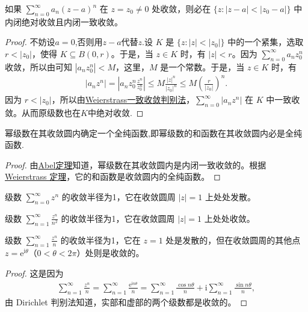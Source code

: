 \documentclass[../../main.tex]{subfiles}%
\begin{document}
\begin{theorem}[Abel定理]\label{theorem:Abel定理-定理4.2.3}
如果 \( \sum_{n=0}^{\infty} a_n (z-a)^n \) 在 \( z = z_0 \neq 0 \) 处收敛，则必在 \( \{z : |z-a| < |z_0-a|\} \) 中内闭绝对收敛且内闭一致收敛。
\end{theorem}
\begin{proof}

不妨设$a=0$,否则用$z-a$代替$z$.设 \( K \) 是 \( \{z : |z| < |z_0|\} \) 中的一个紧集，选取 \( r < |z_0| \)，使得 \( K \subseteq B(0, r) \)。于是，当 \( z \in K \) 时，有 \( |z| < r \)。因为 \( \sum_{n=0}^{\infty} a_n z_0^n \) 收敛，所以由可知 \( |a_n z_0^n| < M \)，这里，\( M \) 是一个常数。于是，当 \( z \in K \) 时，有
\begin{align*}
|a_n z^n| = \left| a_n z_0^n \frac{z^n}{z_0^n} \right| \leqslant M \frac{|z|^n}{|z_0|^n} \leqslant M \left( \frac{r}{|z_0|} \right)^n.
\end{align*}
因为 \( r < |z_0| \)，所以由\hyperref[theorem:Weierstrass一致收敛判别法]{Weierstrass一致收敛判别法}，\( \sum_{n=0}^{\infty} |a_n z^n| \) 在 \( K \) 中一致收敛。从而原级数也在$K$中绝对收敛.

\end{proof}

\begin{theorem}\label{theorem:定理4.2.4}
幂级数在其收敛圆内确定一个全纯函数,即幂级数的和函数在其收敛圆内必是全纯函数.
\end{theorem}
\begin{proof}

由\hyperref[theorem:Abel定理-定理4.2.3]{Abel定理}知道，幂级数在其收敛圆内是内闭一致收敛的。根据 \hyperref[theorem:Weierstrass定理]{Weierstrass 定理}，它的和函数是收敛圆内的全纯函数。

\end{proof}

\begin{example}
级数 \( \sum_{n=0}^{\infty} z^n \) 的收敛半径为1，它在收敛圆周 \( |z| = 1 \) 上处处发散。
\end{example}

\begin{example}
级数 \( \sum_{n=1}^{\infty} \frac{z^n}{n^2} \) 的收敛半径为1，它在收敛圆周 \( |z| = 1 \) 上处处收敛。
\end{example}

\begin{example}
级数 \( \sum_{n=1}^{\infty} \frac{z^n}{n} \) 的收敛半径为1，它在 \( z = 1 \) 处是发散的，但在收敛圆周的其他点 \( z = \mathrm{e}^{\mathrm{i}\theta} \)（\( 0 < \theta < 2\pi \)）处则是收敛的。
\end{example}
\begin{proof}

这是因为
\begin{align*}
\sum_{n=1}^{\infty} \frac{z^n}{n} = \sum_{n=1}^{\infty} \frac{\mathrm{e}^{\mathrm{i}n\theta}}{n} = \sum_{n=1}^{\infty} \frac{\cos n\theta}{n} + \mathrm{i}\sum_{n=1}^{\infty} \frac{\sin n\theta}{n},
\end{align*}
由 Dirichlet 判别法知道，实部和虚部的两个级数都是收敛的。

\end{proof}
\end{document}
